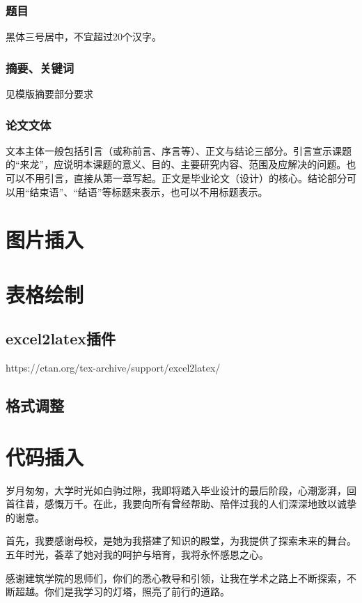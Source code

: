 \documentclass[AutoFakeBold]{ZafuThesis}
\begin{document}
\subsubsection{题目}
黑体三号居中，不宜超过20个汉字。
\subsubsection{摘要、关键词}
见模版摘要部分要求
\subsubsection{论文文体}
文本主体一般包括引言（或称前言、序言等）、正文与结论三部分。引言宣示课题的“来龙”，应说明本课题的意义、目的、主要研究内容、范围及应解决的问题。也可以不用引言，直接从第一章写起。正文是毕业论文（设计）的核心。结论部分可以用“结束语”、“结语”等标题来表示，也可以不用标题表示。\par



\section{图片插入}
\section{表格绘制}
\subsection{excel2latex插件}
https://ctan.org/tex-archive/support/excel2latex/
\subsection{格式调整}


\section{代码插入 }




% 
% 
\Thanks
{
  岁月匆匆，大学时光如白驹过隙，我即将踏入毕业设计的最后阶段，心潮澎湃，回首往昔，感慨万千。在此，我要向所有曾经帮助、陪伴过我的人们深深地致以诚挚的谢意。\par
  首先，我要感谢母校，是她为我搭建了知识的殿堂，为我提供了探索未来的舞台。五年时光，荟萃了她对我的呵护与培育，我将永怀感恩之心。\par
  感谢建筑学院的恩师们，你们的悉心教导和引领，让我在学术之路上不断探索，不断超越。你们是我学习的灯塔，照亮了前行的道路。
}
\end{document}
